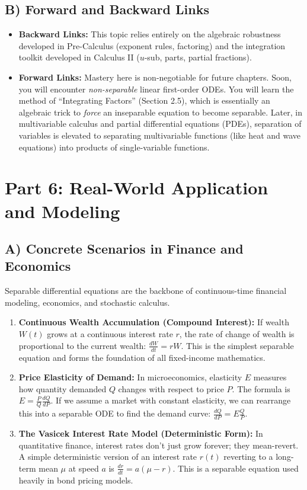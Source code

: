 \documentclass[11pt]{article}
\begin{document}
\subsection{B) Forward and Backward Links}
\begin{itemize}
    \item \textbf{Backward Links:} This topic relies entirely on the algebraic robustness developed in Pre-Calculus (exponent rules, factoring) and the integration toolkit developed in Calculus II ($u$-sub, parts, partial fractions).
    \item \textbf{Forward Links:} Mastery here is non-negotiable for future chapters. Soon, you will encounter \textit{non-separable} linear first-order ODEs. You will learn the method of ``Integrating Factors'' (Section 2.5), which is essentially an algebraic trick to \textit{force} an inseparable equation to become separable. Later, in multivariable calculus and partial differential equations (PDEs), separation of variables is elevated to separating multivariable functions (like heat and wave equations) into products of single-variable functions.
\end{itemize}


\newpage
\section{Part 6: Real-World Application and Modeling}

\subsection{A) Concrete Scenarios in Finance and Economics}
Separable differential equations are the backbone of continuous-time financial modeling, economics, and stochastic calculus.
\begin{enumerate}
    \item \textbf{Continuous Wealth Accumulation (Compound Interest):} If wealth $W(t)$ grows at a continuous interest rate $r$, the rate of change of wealth is proportional to the current wealth: $\frac{dW}{dt} = rW$. This is the simplest separable equation and forms the foundation of all fixed-income mathematics.
    \item \textbf{Price Elasticity of Demand:} In microeconomics, elasticity $E$ measures how quantity demanded $Q$ changes with respect to price $P$. The formula is $E = \frac{P}{Q}\frac{dQ}{dP}$. If we assume a market with constant elasticity, we can rearrange this into a separable ODE to find the demand curve: $\frac{dQ}{dP} = E \frac{Q}{P}$.
    \item \textbf{The Vasicek Interest Rate Model (Deterministic Form):} In quantitative finance, interest rates don't just grow forever; they mean-revert. A simple deterministic version of an interest rate $r(t)$ reverting to a long-term mean $\mu$ at speed $a$ is $\frac{dr}{dt} = a(\mu - r)$. This is a separable equation used heavily in bond pricing models.
\end{enumerate}
\end{document}
